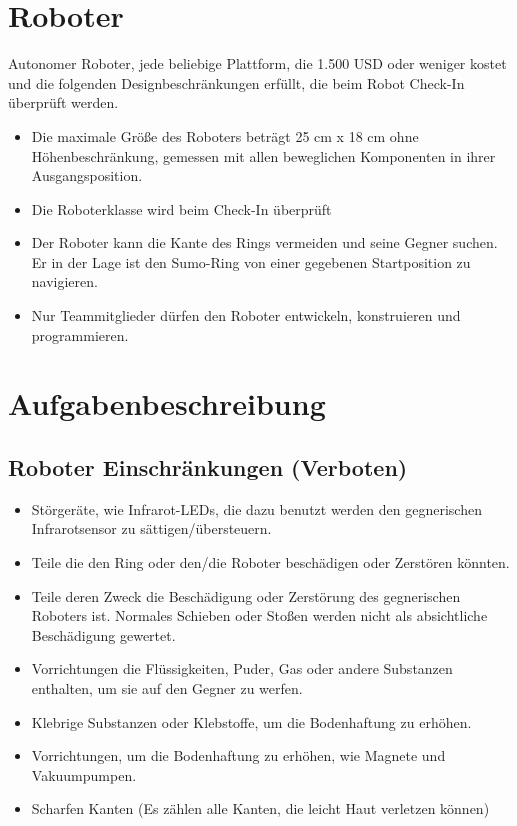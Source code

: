 \documentclass[a4paper,12pt]{article}
\begin{document}
\section{Roboter}
Autonomer Roboter, jede beliebige Plattform, die 1.500 USD oder weniger kostet und die folgenden Designbeschränkungen erfüllt, die beim Robot Check-In überprüft werden.
\begin{itemize}
	\item Die maximale Größe des Roboters beträgt 25 cm x 18 cm ohne Höhenbeschränkung, gemessen mit allen beweglichen Komponenten in ihrer Ausgangsposition.
	\item Die Roboterklasse wird beim Check-In überprüft
	\item Der Roboter kann die Kante des Rings vermeiden und seine Gegner suchen. Er in der Lage ist den Sumo-Ring von einer gegebenen Startposition zu navigieren.
	\item Nur Teammitglieder dürfen den Roboter entwickeln, konstruieren und programmieren.
\end{itemize}

\section{Aufgabenbeschreibung}
\subsection{Roboter Einschränkungen (Verboten)}

\begin{itemize}
	\item Störgeräte, wie Infrarot-LEDs, die dazu benutzt werden den gegnerischen Infrarotsensor zu sättigen/übersteuern. %
	\item Teile die den Ring oder den/die Roboter beschädigen oder Zerstören könnten.
	\item Teile deren Zweck die Beschädigung oder Zerstörung des gegnerischen Roboters ist. Normales Schieben oder Stoßen werden nicht als absichtliche Beschädigung gewertet.
	\item Vorrichtungen die Flüssigkeiten, Puder, Gas oder andere Substanzen enthalten, um sie auf den Gegner zu werfen.
	\item Klebrige Substanzen oder Klebstoffe, um die Bodenhaftung zu erhöhen.
	\item Vorrichtungen, um die Bodenhaftung zu erhöhen, wie Magnete und Vakuumpumpen.
	\item Scharfen Kanten (Es zählen alle Kanten, die leicht Haut verletzen können)
\end{itemize}
\end{document}
